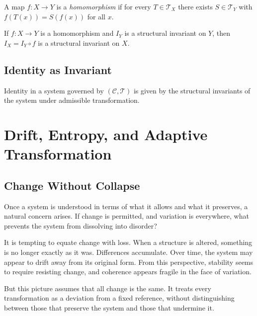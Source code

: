 \documentclass[11pt,openany]{book}
\begin{document}
\begin{definition}[Homomorphism]
\label{def:homomorphism}
A map $f : X \to Y$ is a \emph{homomorphism} if for every
$T \in \mathcal{T}_X$ there exists $S \in \mathcal{T}_Y$
with $f(T(x)) = S(f(x))$ for all $x$.
\end{definition}

\begin{proposition}
\label{prop:homomorphism}
If $f : X \to Y$ is a homomorphism and $I_Y$ is a
structural invariant on $Y$, then $I_X = I_Y \circ f$ is a
structural invariant on $X$.
\end{proposition}

\section{Identity as Invariant}
\label{sec:identity-invariant}

\begin{proposition}
\label{prop:identity}
Identity in a system governed by $(\mathcal{C},
\mathcal{T})$ is given by the structural invariants of the
system under admissible transformation.
\end{proposition}

\chapter{Drift, Entropy, and Adaptive Transformation}
\label{ch:drift}

\section*{ Change Without Collapse}

Once a system is understood in terms of what it allows and what it preserves, a natural concern arises. If change is permitted, and variation is everywhere, what prevents the system from dissolving into disorder?

It is tempting to equate change with loss. When a structure is altered, something is no longer exactly as it was. Differences accumulate. Over time, the system may appear to drift away from its original form. From this perspective, stability seems to require resisting change, and coherence appears fragile in the face of variation.

But this picture assumes that all change is the same. It treats every transformation as a deviation from a fixed reference, without distinguishing between those that preserve the system and those that undermine it.
\end{document}

